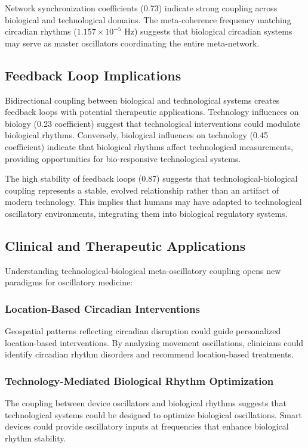 \documentclass[12pt]{article}
\begin{document}
Network synchronization coefficients (0.73) indicate strong coupling across biological and technological domains. The meta-coherence frequency matching circadian rhythms ($1.157 \times 10^{-5}$ Hz) suggests that biological circadian systems may serve as master oscillators coordinating the entire meta-network.

\subsection{Feedback Loop Implications}

Bidirectional coupling between biological and technological systems creates feedback loops with potential therapeutic applications. Technology influences on biology (0.23 coefficient) suggest that technological interventions could modulate biological rhythms. Conversely, biological influences on technology (0.45 coefficient) indicate that biological rhythms affect technological measurements, providing opportunities for bio-responsive technological systems.

The high stability of feedback loops (0.87) suggests that technological-biological coupling represents a stable, evolved relationship rather than an artifact of modern technology. This implies that humans may have adapted to technological oscillatory environments, integrating them into biological regulatory systems.

\subsection{Clinical and Therapeutic Applications}

Understanding technological-biological meta-oscillatory coupling opens new paradigms for oscillatory medicine:

\subsubsection{Location-Based Circadian Interventions}
Geospatial patterns reflecting circadian disruption could guide personalized location-based interventions. By analyzing movement oscillations, clinicians could identify circadian rhythm disorders and recommend location-based treatments.

\subsubsection{Technology-Mediated Biological Rhythm Optimization}
The coupling between device oscillators and biological rhythms suggests that technological systems could be designed to optimize biological oscillations. Smart devices could provide oscillatory inputs at frequencies that enhance biological rhythm stability.
\end{document}
